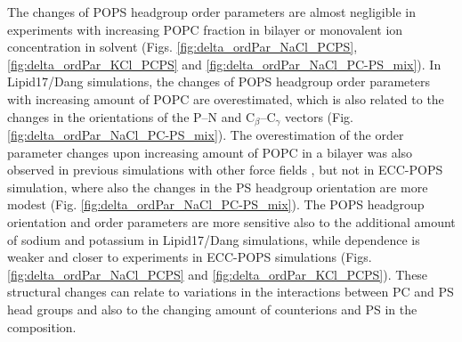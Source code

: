 \documentclass[journal=jpcbfk,manuscript=article]{achemso}
\begin{document}
The changes of POPS headgroup order parameters are almost negligible in experiments with increasing POPC fraction in bilayer
or monovalent ion concentration in solvent
(Figs. \ref{fig:delta_ordPar_NaCl_PCPS}, \ref{fig:delta_ordPar_KCl_PCPS} and \ref{fig:delta_ordPar_NaCl_PC-PS_mix}).
In Lipid17/Dang simulations, the changes of POPS headgroup order parameters with increasing amount of POPC
are overestimated, which is also related to the changes in the orientations of the P--N and C$_{\beta}$--C$_{\gamma}$
vectors (Fig. \ref{fig:delta_ordPar_NaCl_PC-PS_mix}). The overestimation of the order parameter changes
upon increasing amount of POPC in a bilayer 
was also observed in previous simulations with other force fields \cite{NMRlipidsIV}, but not in
ECC-POPS simulation, where also the changes in the PS headgroup orientation are more modest (Fig. \ref{fig:delta_ordPar_NaCl_PC-PS_mix}).
The POPS headgroup orientation and order parameters are more sensitive also to the additional amount
of sodium and potassium in Lipid17/Dang simulations, while dependence is weaker and closer to experiments
in ECC-POPS simulations (Figs. \ref{fig:delta_ordPar_NaCl_PCPS} and \ref{fig:delta_ordPar_KCl_PCPS}).
These structural changes can relate to variations in the interactions between PC and PS head groups 
and also to the changing amount of counterions and PS in the composition. 
\end{document}

